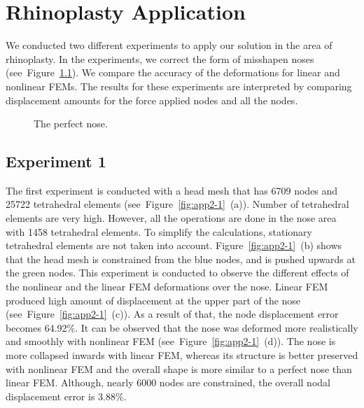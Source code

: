 \appendix
\chapter{Rhinoplasty Application}
\label{chapter8}

We conducted two different experiments to apply our solution in the area of rhinoplasty. In the experiments, we correct the form
of misshapen noses (see~Figure~\ref{fig:app1}). We compare the accuracy of the deformations for linear and nonlinear FEMs. The 
results for these experiments are interpreted by comparing displacement amounts for the force applied nodes and all the nodes. 

\begin{figure}[t]
\centerline{}
\caption{The perfect nose.}
\label{fig:app1}
\end{figure}

\section{Experiment 1}
\label{ai}

The first experiment is conducted with a head mesh that has 6709 nodes and 25722 tetrahedral elements (see~Figure~\ref{fig:app2-1}~(a)). Number of tetrahedral elements are very high. However, all the operations are done in the nose area with 1458 tetrahedral elements. To simplify the calculations, stationary tetrahedral elements are not taken into account. Figure~\ref{fig:app2-1}~(b) shows that the head mesh is constrained from the blue nodes, and is pushed upwards at the green nodes. This experiment is conducted to observe the different effects of the nonlinear and the linear FEM deformations over the nose. Linear FEM produced high amount of displacement at the upper part of the nose (see~Figure~\ref{fig:app2-1}~(c)). As a result of that, the node displacement error becomes 64.92\%. It can be observed that the nose was deformed more realistically and smoothly with nonlinear FEM (see~Figure~\ref{fig:app2-1}~(d)). The nose is more collapsed inwards with linear FEM, whereas its structure is better preserved with nonlinear FEM and the overall shape is more similar to a perfect nose than linear FEM. Although, nearly 6000 nodes are constrained, the overall nodal displacement error is 3.88\%.

